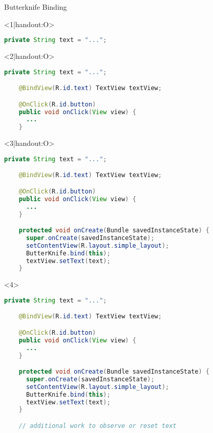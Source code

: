 \begin{frame}[fragile]{Butterknife Binding}
\begin{onlyenv}<1|handout:O>
  \begin{lstlisting}[language=Java]
    private String text = "...";
  \end{lstlisting}
\end{onlyenv}
\begin{onlyenv}<2|handout:O>
  \begin{lstlisting}[language=Java]
    private String text = "...";

    @BindView(R.id.text) TextView textView;

    @OnClick(R.id.button)
    public void onClick(View view) {
      ...
    }
  \end{lstlisting}
\end{onlyenv}
\begin{onlyenv}<3|handout:O>
  \begin{lstlisting}[language=Java]
    private String text = "...";

    @BindView(R.id.text) TextView textView;

    @OnClick(R.id.button)
    public void onClick(View view) {
      ...
    }

    protected void onCreate(Bundle savedInstanceState) {
      super.onCreate(savedInstanceState);
      setContentView(R.layout.simple_layout);
      ButterKnife.bind(this);
      textView.setText(text);
    }
  \end{lstlisting}
\end{onlyenv}
\begin{onlyenv}<4>
  \begin{lstlisting}[language=Java]
    private String text = "...";

    @BindView(R.id.text) TextView textView;

    @OnClick(R.id.button)
    public void onClick(View view) {
      ...
    }

    protected void onCreate(Bundle savedInstanceState) {
      super.onCreate(savedInstanceState);
      setContentView(R.layout.simple_layout);
      ButterKnife.bind(this);
      textView.setText(text);
    }

    // additional work to observe or reset text
  \end{lstlisting}
\end{onlyenv}
\end{frame}
